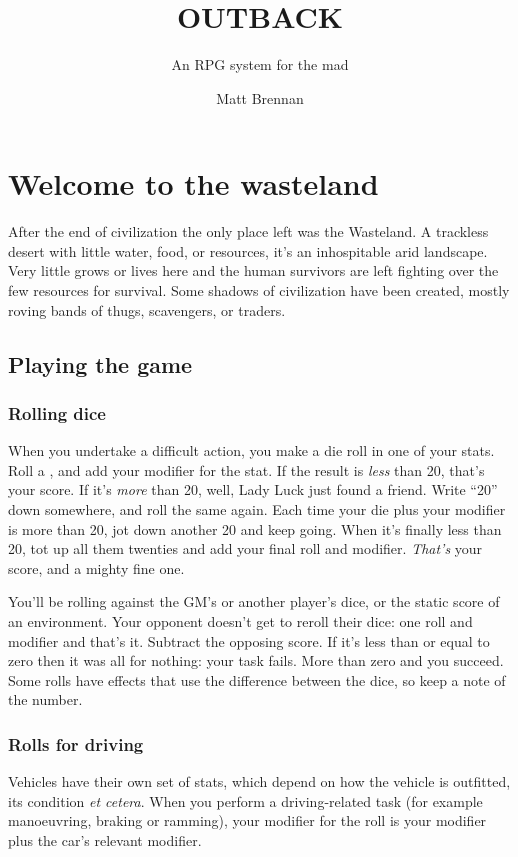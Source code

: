 \documentclass[10pt, a4paper, twocolumn]{book}
\title{\uppercase{Outback}}
\subtitle{An RPG system for the mad}
\author{Matt Brennan}
\date{}
\begin{document}
\frontmatter
\maketitle
\tableofcontents

\mainmatter
\chapter{Welcome to the wasteland}
After the end of civilization the only place left was the Wasteland. A trackless desert with little water, food, or resources, it's an inhospitable arid landscape. Very little grows or lives here and the human survivors are left fighting over the few resources for survival. Some shadows of civilization have been created, mostly roving bands of thugs, scavengers, or traders.
\section{Playing the game}
\subsection{Rolling dice}
When you undertake a difficult action, you make a die roll in one of your stats.
Roll a , and add your modifier for the stat. If the result is
\emph{less} than 20, that's your score. If it's \emph{more} than 20, well, Lady
Luck just found a friend. Write ``20'' down somewhere, and roll the same again. Each
time your die plus your modifier is more than 20, jot down another 20 and keep going.
When it's finally less than 20, tot up all them twenties and add your final roll
and modifier. \emph{That's} your score, and a mighty fine one.

You'll be rolling against the GM's or another player's dice, or the static score
of an environment. Your opponent doesn't get to reroll their dice: one roll and
modifier and that's it. Subtract the opposing score. If it's less than or equal
to zero then it was all for nothing: your task fails. More than zero and you
succeed. Some rolls have effects that use the difference between the dice, so
keep a note of the number.

\subsection{Rolls for driving}
Vehicles have their own set of stats, which depend on how the vehicle is
outfitted, its condition \emph{et cetera}. When you perform a driving-related
task (for example manoeuvring, braking or ramming), your modifier for the roll
is your  modifier plus the car's relevant modifier.
\end{document}
